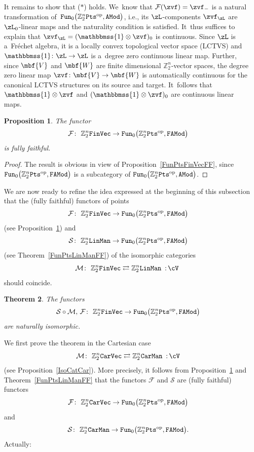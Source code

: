 \documentclass[10pt,a4paper]{amsart}
\newcommand{\Id}{\mathbbmss{1}}
\newcommand{\op}[1]{\operatorname{#1}}
\newcommand{\Z}{{\mathbb Z}}
\def\cM{\cal M}
\def\cF{\mathcal{F}}
\def\cM{\mathcal{M}}
\newcommand{\0}{\otimes}
\newcommand{\z}{\Z_2^n}
\numberwithin{equation}{section}
\newtheorem{Theorem}{Theorem}[section]
\newtheorem{Proposition}[Theorem]{Proposition}
 { \theoremstyle{definition}
\newtheorem{Definition}[Theorem]{Definition}
\newtheorem{Example}[Theorem]{Example}
\newtheorem{Remark}[Theorem]{Remark} }
\providecommand{\cal}{\mathcal}
\begin{document}
It remains to show that ($\ast$) holds. We~know that $\cF(\zvf)=\zvf_-$ is a natural transformation of~${\tt Fun}_0\big(\z{\tt Pts}^{\op{op}},{\tt AMod}\big)$, i.e., its $\zL$-components $\zvf_\zL$ are $\zL_0$-linear maps and the naturality condition is satisfied. It~thus suffices to explain that $\zvf_\zL=(\Id\0\zvf)_0$ is continuous. Since $\zL$ is a~Fr\'echet algebra, it is a locally convex topological vector space ({\small LCTVS}) and $\Id\colon \zL\to\zL$ is a~degree zero continuous linear map. Further, since $\mbf{V}$ and $\mbf{W}$ are finite dimensional $\z$-vector spaces, the deg\-ree zero linear map $\zvf\colon \mbf{V}\to\mbf{W}$ is automatically continuous for the canonical {\small LCTVS} structures on its source and target. It~follows that $\Id\0\zvf$ and $(\Id\0\zvf)_0$ are continuous linear maps.

\begin{Proposition}\label{FunPtsFinVecFF2}
The functor
\[
\cF\colon\ \z{\tt FinVec}\to{\tt Fun}_0\big(\z{\tt Pts}^{\op{op}},{\tt FAMod}\big)
\]
is fully faithful.
\end{Proposition}

\begin{proof}
The result is obvious in view of Proposition~\ref{FunPtsFinVecFF}, since ${\tt Fun}_0\big(\z{\tt Pts}^{\op{op}},{\tt FAMod}\big)$ is a subcategory of ${\tt Fun}_0\big(\z{\tt Pts}^{\op{op}},{\tt AMod}\big)$.
\end{proof}

\newcommand{\cS}{\mathcal{S}}

We are now ready to refine the idea expressed at the beginning of this subsection that the (fully faithful) functors of points
\[
\cF\colon\ \z{\tt FinVec}\to{\tt Fun}_0\big(\z{\tt Pts}^{\op{op}},{\tt FAMod}\big)
\]
(see Proposition~\ref{FunPtsFinVecFF2}) and
\[
\mathcal{S}\colon\ \z{\tt LinMan}\to{\tt Fun}_0\big(\z{\tt Pts}^{\op{op}},\tt FAMod\big)
\]
(see Theorem~\ref{FunPtsLinManFF}) of the isomorphic categories
\[
\cM\colon\ \z{\tt FinVec}\rightleftarrows\z{\tt LinMan}\ \,{:}\, \cV\
\]
should coincide.

\begin{Theorem}\label{NatIsoSMFGene}
The functors
\[
\mathcal{S}\circ\cM,\, \cF\colon\ \z{\tt FinVec}\to{\tt Fun}_0\big(\z{\tt Pts}^{\op{op}},{\tt FAMod}\big)
\]
are naturally isomorphic.
\end{Theorem}

\newcommand{\sfi}{\textsf{I}}

We first prove the theorem in the Cartesian case
\[
\mathcal{M}\colon\ \Z_2^n{\tt CarVec}\rightleftarrows\Z_2^n\tt CarMan\ \,{:}\, \cV
\]
(see Proposition~\ref{IsoCatCar}). More precisely, it follows from Proposition~\ref{FunPtsFinVecFF2} and Theorem~\ref{FunPtsLinManFF} that the functors $\cF$ and $\cS$ are (fully faithful) functors
\[
\cF\colon\ \z{\tt CarVec}\to{\tt Fun}_0\big(\z{\tt Pts}^{\op{op}},{\tt FAMod}\big)
\]
and
\[
\mathcal S\colon\ \z{\tt CarMan}\to{\tt Fun}_0\big(\z{\tt Pts}^{\op{op}},{\tt FAMod}\big).
\]
Actually:
\end{document}
